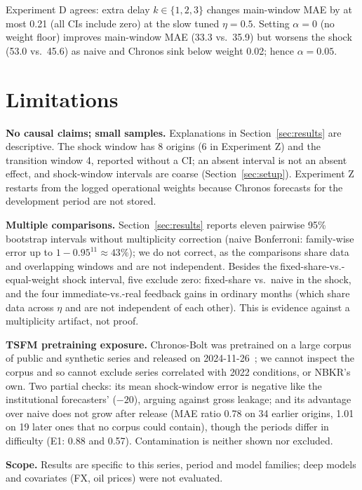 \documentclass[runningheads]{llncs}
\begin{document}
Experiment D agrees: extra delay $k \in \{1,2,3\}$ changes main-window MAE by at most 0.21 (all CIs
include zero) at the slow tuned $\eta=0.5$. Setting $\alpha=0$ (no weight floor) improves main-window MAE (33.3 vs.\ 35.9) but worsens the shock
(53.0 vs.\ 45.6) as naive and Chronos sink below weight 0.02; hence $\alpha=0.05$.

\section{Limitations}
\label{sec:limitations}

\textbf{No causal claims; small samples.} Explanations in Section~\ref{sec:results} are descriptive. The shock window has 8 origins (6 in Experiment Z) and the
transition window 4, reported without a CI; an absent interval is not an absent effect, and
shock-window intervals are coarse (Section~\ref{sec:setup}). Experiment Z restarts from the
logged operational weights because Chronos forecasts for the development period are not stored.

\textbf{Multiple comparisons.} Section~\ref{sec:results} reports eleven pairwise 95\% bootstrap
intervals without multiplicity correction (naive Bonferroni: family-wise error up to
$1-0.95^{11}\approx43\%$); we do not correct, as the comparisons share data and overlapping windows
and are not independent. Besides the fixed-share-vs.-equal-weight shock interval, five exclude zero:
fixed-share vs.\ naive in the shock, and the four immediate-vs.-real feedback gains in ordinary months
(which share data across $\eta$ and are not independent of each other). This is evidence against a
multiplicity artifact, not proof.

\textbf{TSFM pretraining exposure.} Chronos-Bolt was pretrained on a large corpus of public and
synthetic series and released on 2024-11-26~\cite{chronosbolt}; we cannot inspect the corpus and so
cannot exclude series correlated with 2022 conditions, or NBKR's own. Two partial checks: its mean
shock-window error is negative like the institutional forecasters' ($-20$), arguing against gross
leakage; and its advantage over naive does not grow after release (MAE ratio 0.78 on 34 earlier
origins, 1.01 on 19 later ones that no corpus could contain), though the periods differ in difficulty
(E1: 0.88 and 0.57). Contamination is neither shown nor excluded.

\textbf{Scope.} Results are specific to this series, period and model families; deep models and
covariates (FX, oil prices) were not evaluated.
\end{document}
